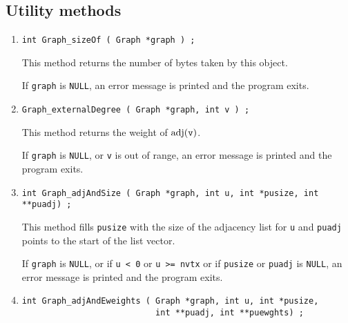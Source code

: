 \subsection{Utility methods}
\label{subsection:Graph:proto:utilities}
\par
\begin{enumerate}
\item
\begin{verbatim}
int Graph_sizeOf ( Graph *graph ) ;
\end{verbatim}
This method returns the number of bytes taken by this object.
\par {}
If {\tt graph} is {\tt NULL},
an error message is printed and the program exits.
\item
\begin{verbatim}
Graph_externalDegree ( Graph *graph, int v ) ;
\end{verbatim}
This method returns the weight of $\mbox{adj}(\mbox{\tt v})$.
\par {}
If {\tt graph} is {\tt NULL},
or {\tt v} is out of range,
an error message is printed and the program exits.
\item
\begin{verbatim}
int Graph_adjAndSize ( Graph *graph, int u, int *pusize, int **puadj) ;
\end{verbatim}
This method fills {\tt *pusize} with the size of the adjacency
list for {\tt u} 
and {\tt *puadj} points to the start of the list vector.
\par {}
If {\tt graph} is {\tt NULL},
or if {\tt u < 0} or {\tt u >= nvtx}
or if {\tt pusize} or {\tt puadj} is {\tt NULL},
an error message is printed and the program exits.
\item
\begin{verbatim}
int Graph_adjAndEweights ( Graph *graph, int u, int *pusize, 
                           int **puadj, int **puewghts) ;
\end{verbatim}

\end{enumerate}
